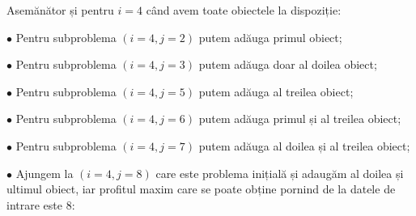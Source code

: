 \begin{sloppypar}
Asemănător și pentru $i = 4$ când avem toate obiectele la dispoziție: \par
$\bullet$ Pentru subproblema $(i = 4, j = 2)$ putem adăuga primul obiect; \par
$\bullet$ Pentru subproblema $(i = 4, j = 3)$ putem adăuga doar al doilea obiect; \par
$\bullet$ Pentru subproblema $(i = 4, j = 5)$ putem adăuga al treilea obiect; \par
$\bullet$ Pentru subproblema $(i = 4, j = 6)$ putem adăuga primul și al treilea obiect; \par
$\bullet$ Pentru subproblema $(i = 4, j = 7)$ putem adăuga al doilea și al treilea obiect; \par
$\bullet$ Ajungem la $(i = 4, j = 8)$ care este problema inițială și adaugăm al doilea și ultimul obiect, iar profitul maxim care se poate obține pornind de la datele de intrare este 8: \par


\end{sloppypar}
